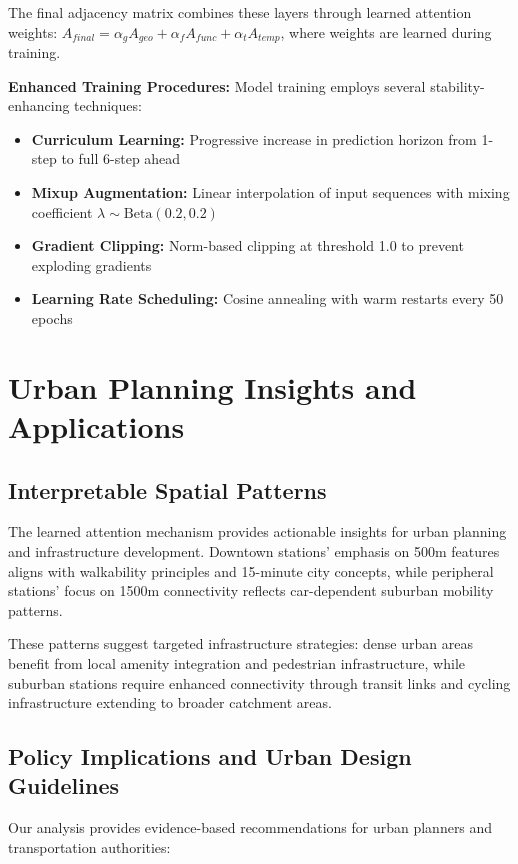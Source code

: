 \documentclass[sigconf,review,nonacm]{acmart}
\begin{document}
The final adjacency matrix combines these layers through learned attention weights: $A_{final} = \alpha_g A_{geo} + \alpha_f A_{func} + \alpha_t A_{temp}$, where weights are learned during training.

\textbf{Enhanced Training Procedures:}
Model training employs several stability-enhancing techniques:
\begin{itemize}
\item \textbf{Curriculum Learning:} Progressive increase in prediction horizon from 1-step to full 6-step ahead
\item \textbf{Mixup Augmentation:} Linear interpolation of input sequences with mixing coefficient $\lambda \sim \text{Beta}(0.2, 0.2)$
\item \textbf{Gradient Clipping:} Norm-based clipping at threshold 1.0 to prevent exploding gradients
\item \textbf{Learning Rate Scheduling:} Cosine annealing with warm restarts every 50 epochs
\end{itemize}

\section{Urban Planning Insights and Applications}

\subsection{Interpretable Spatial Patterns}

The learned attention mechanism provides actionable insights for urban planning and infrastructure development. Downtown stations' emphasis on 500m features aligns with walkability principles and 15-minute city concepts, while peripheral stations' focus on 1500m connectivity reflects car-dependent suburban mobility patterns.

These patterns suggest targeted infrastructure strategies: dense urban areas benefit from local amenity integration and pedestrian infrastructure, while suburban stations require enhanced connectivity through transit links and cycling infrastructure extending to broader catchment areas.

\subsection{Policy Implications and Urban Design Guidelines}

Our analysis provides evidence-based recommendations for urban planners and transportation authorities:
\end{document}
